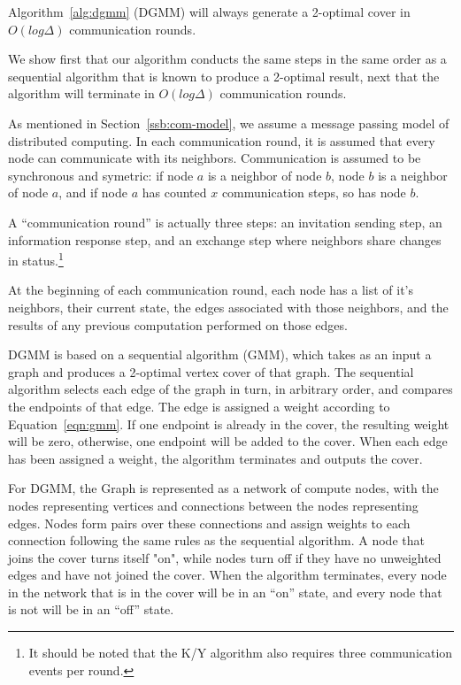 \begin{thm}
  Algorithm~\ref{alg:dgmm} (DGMM) will always generate a 2-optimal cover in $O(log\Delta)$ communication rounds.
\label{thm:dgmm-term}
\end{thm}
\begin{smy}
We show first that our algorithm conducts the same steps in the same order as a sequential algorithm that is known to produce a 2-optimal result, next that the algorithm will terminate in $O(log\Delta)$ communication rounds.
\end{smy} 

\begin{note}
\label{not:com-model}
As mentioned in Section~\ref{ssb:com-model}, we assume a message passing model of distributed computing. In each communication round, it is assumed that every node can communicate with its neighbors. Communication is assumed to be synchronous and symetric: if node $a$ is a neighbor of node $b$, node $b$ is a neighbor of node $a$, and if node $a$ has counted $x$ communication steps, so has node $b$.

A ``communication round'' is actually three steps: an invitation sending step, an information response step, and an exchange step where neighbors share changes in status.\footnote{It should be noted that the K/Y algorithm also requires three communication events per round.} 
\end{note}
\begin{note}
\label{not:dgmm-local-info}
At the beginning of each communication round, each node has a list of it's neighbors, their current state, the edges associated with those neighbors, and the results of any previous computation performed on those edges.
\end{note}
\begin{note}
\label{not:gmm-dgmm}
DGMM is based on a sequential algorithm (GMM), which takes as an input a graph and produces a 2-optimal vertex cover of that graph. The sequential algorithm selects each edge of the graph in turn, in arbitrary order, and compares the endpoints of that edge. The edge is assigned a weight according to Equation~\ref{eqn:gmm}. If one endpoint is already in the cover, the resulting weight will be zero, otherwise, one endpoint will be added to the cover. When each edge has been assigned a weight, the algorithm terminates and outputs the cover.

For DGMM, the Graph is represented as a network of compute nodes, with the nodes representing vertices and connections between the nodes representing edges. Nodes form pairs over these connections and assign weights to each connection following the same rules as the sequential algorithm. A node that joins the cover turns itself "on", while nodes turn off if they have no unweighted edges and have not joined the cover. When the algorithm terminates, every node in the network that is in the cover will be in an ``on'' state, and every node that is not will be in an ``off'' state.
\end{note}
